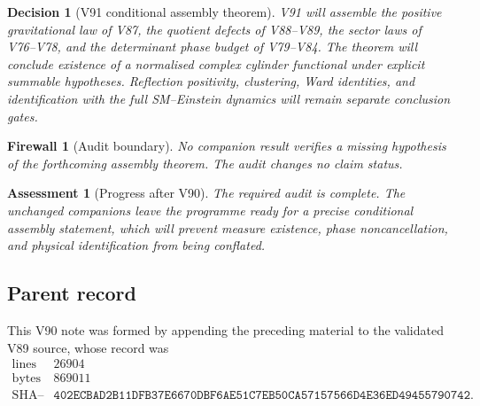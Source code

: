 \documentclass[11pt]{article}
\newtheorem{assessment}[theorem]{Assessment}
\newtheorem{firewall}[theorem]{Firewall}
\newtheorem{decision}[theorem]{Decision}
\begin{document}
\begin{decision}[V91 conditional assembly theorem]
\label{dec:v11v90-next}
V91 will assemble the positive gravitational law of V87, the quotient
defects of V88--V89, the sector laws of V76--V78, and the determinant
phase budget of V79--V84.  The theorem will conclude existence of a
normalised complex cylinder functional under explicit summable
hypotheses.  Reflection positivity, clustering, Ward identities, and
identification with the full SM--Einstein dynamics will remain
separate conclusion gates.
\end{decision}

\begin{firewall}[Audit boundary]
\label{fire:v11v90-boundary}
No companion result verifies a missing hypothesis of the forthcoming
assembly theorem.  The audit changes no claim status.
\end{firewall}

\begin{assessment}[Progress after V90]
\label{ass:v11v90-status}
The required audit is complete.  The unchanged companions leave the
programme ready for a precise conditional assembly statement, which
will prevent measure existence, phase noncancellation, and physical
identification from being conflated.
\end{assessment}

\subsection{Parent record}

This V90 note was formed by appending the preceding material to the
validated V89 source, whose record was
\[
\begin{array}{c|c}
\text{lines}&26904\\
\text{bytes}&869011\\
\text{SHA--256}&
\texttt{402ECBAD2B11DFB37E6670DBF6AE51C7EB50CA57157566D4E36ED49455790742}.
\end{array}                                                     \tag{90.2}
\]

\end{document}
